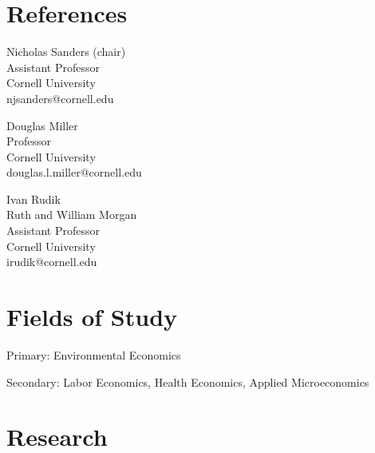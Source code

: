 \documentclass[letterpaper]{article}
\renewenvironment{itemize}{
  \begin{list}{}{
    \setlength{\leftmargin}{0.35em}
  }
}{
  \end{list}
}
\begin{document}
\section*{References}
\begin{minipage}{0.35\linewidth}
	Nicholas Sanders (chair) \\
	Assistant Professor \\
	Cornell University \\
	njsanders@cornell.edu
\end{minipage}
\begin{minipage}{0.35\linewidth}
	Douglas Miller \\
	Professor \\
	Cornell University \\
	douglas.l.miller@cornell.edu
\end{minipage}
\begin{minipage}{0.35\linewidth}
	Ivan Rudik \\
	Ruth and William Morgan \\
	Assistant Professor \\
	Cornell University \\
	irudik@cornell.edu
\end{minipage}

\section*{Fields of Study}
\begin{itemize}
\item Primary: Environmental Economics
\item Secondary: Labor Economics, Health Economics, Applied Microeconomics
\end{itemize}

\section*{Research}
\end{document}
